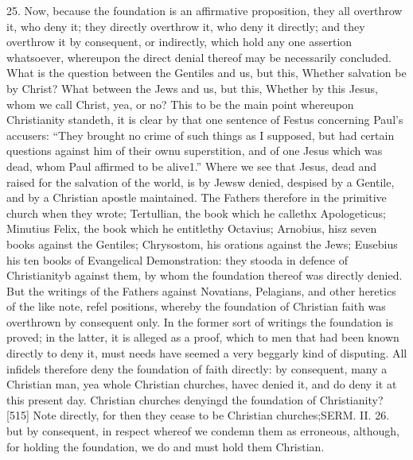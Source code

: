 25. Now, because the foundation is an affirmative proposition, they all overthrow it, who deny it; they directly overthrow it, who deny it directly; and they overthrow it by consequent, or indirectly, which hold any one assertion whatsoever, whereupon the direct denial thereof may be necessarily concluded. What is the question between the Gentiles and us, but this, Whether salvation be by Christ? What between the Jews and us, but this, Whether by this Jesus, whom we call Christ, yea, or no? This to be the main point whereupon Christianity standeth, it is clear by that one sentence of Festus concerning Paul’s accusers: “They brought no crime of such things as I supposed, but had certain questions against him of their ownu superstition, and of one Jesus which was dead, whom Paul affirmed to be alive1.” Where we see that Jesus, dead and raised for the salvation of the world, is by Jewsw denied, despised by a Gentile, and by a Christian apostle maintained. The Fathers therefore in the primitive church when they wrote; Tertullian, the book which he callethx Apologeticus; Minutius Felix, the book which he entitlethy Octavius; Arnobius, hisz seven books against the Gentiles; Chrysostom, his orations against the Jews; Eusebius his ten books of Evangelical Demonstration: they stooda in defence of Christianityb against them, by whom the foundation thereof was directly denied. But the writings of the Fathers against Novatians, Pelagians, and other heretics of the like note, refel positions, whereby the foundation of Christian faith was overthrown by consequent only. In the former sort of writings the foundation is proved; in the latter, it is alleged as a proof, which to men that had been known directly to deny it, must needs have seemed a very beggarly kind of disputing. All infidels therefore deny the foundation of faith directly: by consequent, many a Christian man, yea whole Christian churches, havec denied it, and do deny it at this present day. Christian churches denyingd the foundation of Christianity? [515] Note directly, for then they cease to be Christian churches;SERM. II. 26. but by consequent, in respect whereof we condemn them as erroneous, although, for holding the foundation, we do and must hold them Christian.

